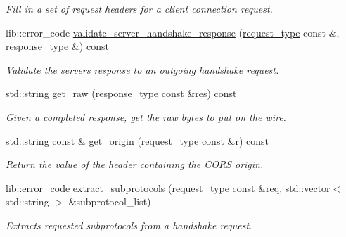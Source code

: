\begin{DoxyCompactItemize}
\begin{DoxyCompactList}\small\item\em Fill in a set of request headers for a client connection request. \end{DoxyCompactList}\item 
lib\+::error\+\_\+code \hyperlink{classwebsocketpp_1_1processor_1_1hybi00_ac348d8e987ed762492ebb9df24766a51}{validate\+\_\+server\+\_\+handshake\+\_\+response} (\hyperlink{classwebsocketpp_1_1processor_1_1hybi00_a9992ac4efa9cc4d46ee0e9e1060cf860}{request\+\_\+type} const \&, \hyperlink{classwebsocketpp_1_1processor_1_1hybi00_abef7fc8290a6d30e086c639d5e0b393d}{response\+\_\+type} \&) const 
\begin{DoxyCompactList}\small\item\em Validate the server\textquotesingle{}s response to an outgoing handshake request. \end{DoxyCompactList}\item 
std\+::string \hyperlink{classwebsocketpp_1_1processor_1_1hybi00_a8cfa137562040da67240b0e72c44e3eb}{get\+\_\+raw} (\hyperlink{classwebsocketpp_1_1processor_1_1hybi00_abef7fc8290a6d30e086c639d5e0b393d}{response\+\_\+type} const \&res) const 
\begin{DoxyCompactList}\small\item\em Given a completed response, get the raw bytes to put on the wire. \end{DoxyCompactList}\item 
std\+::string const \& \hyperlink{classwebsocketpp_1_1processor_1_1hybi00_aed848bc2fced3017e177a261f8a1b83f}{get\+\_\+origin} (\hyperlink{classwebsocketpp_1_1processor_1_1hybi00_a9992ac4efa9cc4d46ee0e9e1060cf860}{request\+\_\+type} const \&r) const 
\begin{DoxyCompactList}\small\item\em Return the value of the header containing the C\+O\+R\+S origin. \end{DoxyCompactList}\item 
lib\+::error\+\_\+code \hyperlink{classwebsocketpp_1_1processor_1_1hybi00_ab7b5ff7d3a174454404fe97314ed4717}{extract\+\_\+subprotocols} (\hyperlink{classwebsocketpp_1_1processor_1_1hybi00_a9992ac4efa9cc4d46ee0e9e1060cf860}{request\+\_\+type} const \&req, std\+::vector$<$ std\+::string $>$ \&subprotocol\+\_\+list)
\begin{DoxyCompactList}\small\item\em Extracts requested subprotocols from a handshake request. \end{DoxyCompactList}\item 

\end{DoxyCompactItemize}
